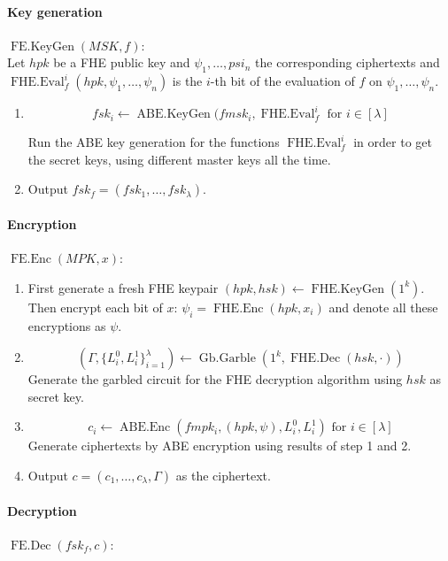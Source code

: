 \documentclass[11pt, a4paper]{article}
\newcommand{\op}[1]{\operatorname{#1}}
\begin{document}
\paragraph{Key generation}
$\op{FE.KeyGen}(MSK, f)$: \\
Let $hpk$ be a FHE public key and $\psi_1, \dots, psi_n$ the corresponding ciphertexts and $\op{FHE.Eval}_f^i(hpk, \psi_1, \dots, \psi_n)$ is the $i$-th bit of the evaluation of $f$ on $\psi_1, \dots, \psi_n$.

\begin{enumerate}
    \item
        \[ fsk_i \gets \op{ABE.KeyGen}(fmsk_i, \op{FHE.Eval}_f^i \text{ for } i \in [\lambda] \]

        Run the ABE key generation for the functions $\op{FHE.Eval}_f^i$ in order to get the secret keys, using different master keys all the time.
    \item
        Output $fsk_f = (fsk_1, \dots, fsk_{\lambda})$.
\end{enumerate}


\paragraph{Encryption}
$\op{FE.Enc}(MPK, x)$:

\begin{enumerate}
    \item First generate a fresh FHE keypair $(hpk, hsk) \gets \op{FHE.KeyGen}(1^k)$. Then encrypt each bit of $x$: $\psi_i = \op{FHE.Enc}(hpk, x_i)$ and denote all these encryptions as $\psi$.
    \item
        \[
            \left( \Gamma, \{ L_i^0, L_i^1 \}_{i=1}^{\lambda} \right ) \gets \op{Gb.Garble}(1^k, \op{FHE.Dec}(hsk,\cdot))
        \]
        Generate the garbled circuit for the FHE decryption algorithm using $hsk$ as secret key.
    \item
        \[
            c_i \gets \op{ABE.Enc}(fmpk_i, (hpk, \psi), L_i^0, L_i^1) \text{ for } i \in [\lambda]
        \]
        Generate ciphertexts by ABE encryption using results of step 1 and 2.
    \item
        Output $c = (c_1, \dots, c_{\lambda}, \Gamma)$ as the ciphertext.
\end{enumerate}

\paragraph{Decryption}
$\op{FE.Dec}(fsk_f, c)$:
\end{document}
